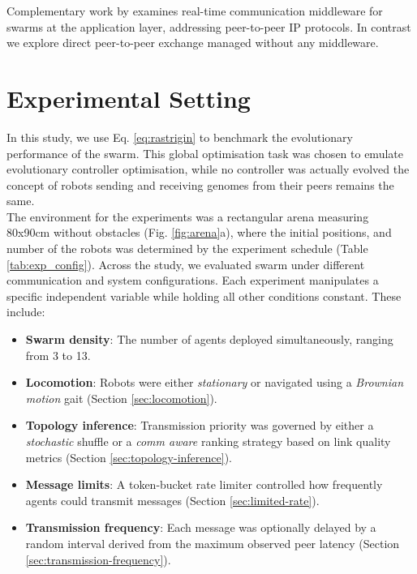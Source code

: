 \documentclass[conference]{IEEEtran}
\begin{document}
Complementary work by \cite{rabbah_real_2021} examines real-time communication middleware for swarms at the application layer, addressing peer-to-peer IP protocols. In contrast we explore direct peer-to-peer exchange managed without any middleware. \\



\section{Experimental Setting}

In this study, we use Eq. \ref{eq:rastrigin} to benchmark the evolutionary performance of the swarm. This global optimisation task was chosen to emulate evolutionary controller optimisation, while no controller was actually evolved the concept of robots sending and receiving genomes from their peers remains the same. \\

The environment for the experiments was a rectangular arena measuring 80x90cm without obstacles (Fig. \ref{fig:arena}a), where the initial positions, and number of the robots was determined by the experiment schedule (Table \ref{tab:exp_config}). Across the study, we evaluated swarm under different communication and system configurations. Each experiment manipulates a specific independent variable while holding all other conditions constant. These include:\\

\begin{itemize}
  \item \textbf{Swarm density}: The number of agents deployed simultaneously, ranging from 3 to 13.
  \item \textbf{Locomotion}: Robots were either \emph{stationary} or navigated using a \emph{Brownian motion} gait (Section \ref{sec:locomotion}).
  \item \textbf{Topology inference}: Transmission priority was governed by either a \emph{stochastic} shuffle or a \emph{comm aware} ranking strategy based on link quality metrics (Section \ref{sec:topology-inference}).
  \item \textbf{Message limits}: A token-bucket rate limiter controlled how frequently agents could transmit messages (Section \ref{sec:limited-rate}).
  \item \textbf{Transmission frequency}: Each message was optionally delayed by a random interval derived from the maximum observed peer latency (Section \ref{sec:transmission-frequency}).
\end{itemize}
\end{document}
